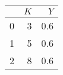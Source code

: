 \begin{tabular}{lrr}
\toprule
{} &  $K$ &  $Y$ \\
\midrule
0 &    3 &  0.6 \\
1 &    5 &  0.6 \\
2 &    8 &  0.6 \\
\bottomrule
\end{tabular}
